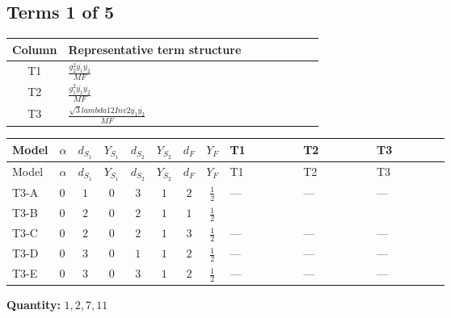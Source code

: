 \documentclass[8pt]{article}
\begin{document}
\begin{landscape}
\subsection*{Terms 1 of 5}
\begin{center}
\begin{tabular}{@{}c >{\raggedright\arraybackslash}p{0.82\linewidth}@{}}
\toprule
Column & Representative term structure \\
\midrule
T1 & \(\displaystyle \frac{g_{2}^{2} \overline{y_{1}} \overline{y_{2}}}{MF}\) \\
\midrule
T2 & \(\displaystyle \frac{g_{1}^{2} \overline{y_{1}} \overline{y_{2}}}{MF}\) \\
\midrule
T3 & \(\displaystyle \frac{\sqrt{3} lambda12Inv2 \overline{y_{1}} \overline{y_{2}}}{MF}\) \\
\midrule
\bottomrule
\end{tabular}
\end{center}
\smallskip
\tiny
\begin{longtable}{@{}llcccccc >{\raggedright\arraybackslash}p{0.21\linewidth} >{\raggedright\arraybackslash}p{0.21\linewidth} >{\raggedright\arraybackslash}p{0.21\linewidth}@{}}
\toprule
Model & $\alpha$ & $d_{S_1}$ & $Y_{S_1}$ & $d_{S_2}$ & $Y_{S_2}$ & $d_F$ & $Y_F$ & T1 & T2 & T3 \\
\midrule
\endfirsthead
\toprule
Model & $\alpha$ & $d_{S_1}$ & $Y_{S_1}$ & $d_{S_2}$ & $Y_{S_2}$ & $d_F$ & $Y_F$ & T1 & T2 & T3 \\
\midrule
\endhead
T3-A & $0$ & $1$ & $0$ & $3$ & $1$ & $2$ & $\frac{1}{2}$ & --- & --- & --- \\
\midrule
T3-B & $0$ & $2$ & $0$ & $2$ & $1$ & $1$ & $\frac{1}{2}$ & \scriptsize\adjustbox{max width=\linewidth}{$\begin{gathered} - \frac{3 g_{2}^{2} \overline{y_{1}} \overline{y_{2}}}{8 MF}\end{gathered}$} & \scriptsize\adjustbox{max width=\linewidth}{$\begin{gathered} - \frac{3 g_{1}^{2} \overline{y_{1}} \overline{y_{2}}}{16 MF}\end{gathered}$} & \scriptsize\adjustbox{max width=\linewidth}{$\begin{gathered} - \frac{\sqrt{3} lambda12Inv2 \overline{y_{1}} \overline{y_{2}}}{6 MF}\end{gathered}$} \\
\midrule
T3-C & $0$ & $2$ & $0$ & $2$ & $1$ & $3$ & $\frac{1}{2}$ & --- & --- & --- \\
\midrule
T3-D & $0$ & $3$ & $0$ & $1$ & $1$ & $2$ & $\frac{1}{2}$ & --- & --- & --- \\
\midrule
T3-E & $0$ & $3$ & $0$ & $3$ & $1$ & $2$ & $\frac{1}{2}$ & --- & --- & --- \\
\midrule
\bottomrule
\end{longtable}
\clearpage
\noindent\textbf{Quantity: }$\mathrm{1,2,7,11}$\par\smallskip

\end{landscape}
\end{document}
